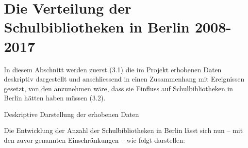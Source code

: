 \documentclass[a4paper,
fontsize=11pt,
oneside,
numbers=noperiodatend,
parskip=half-,
bibliography=totoc,
final
]{scrartcl}
\begin{document}
\section{Die Verteilung der Schulbibliotheken in Berlin
2008-2017}\label{die-verteilung-der-schulbibliotheken-in-berlin-2008-2017}

In diesem Abschnitt werden zuerst (3.1) die im Projekt erhobenen Daten
deskriptiv dargestellt und anschliessend in einen Zusammenhang mit
Ereignissen gesetzt, von den anzunehmen wäre, dass sie Einfluss auf
Schulbibliotheken in Berlin hätten haben müssen (3.2).

Deskriptive Darstellung der erhobenen Daten

Die Entwicklung der Anzahl der Schulbibliotheken in Berlin lässt sich
nun -- mit den zuvor genannten Einschränkungen -- wie folgt darstellen:
\end{document}
